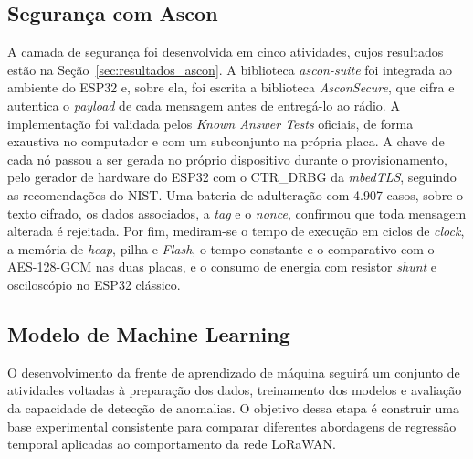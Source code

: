 

\subsection{Segurança com Ascon}
A camada de segurança foi desenvolvida em cinco atividades, cujos resultados estão na Seção~\ref{sec:resultados_ascon}. A biblioteca \textit{ascon-suite} foi integrada ao ambiente do ESP32 e, sobre ela, foi escrita a biblioteca \textit{AsconSecure}, que cifra e autentica o \textit{payload} de cada mensagem antes de entregá-lo ao rádio. A implementação foi validada pelos \textit{Known Answer Tests} oficiais, de forma exaustiva no computador e com um subconjunto na própria placa. A chave de cada nó passou a ser gerada no próprio dispositivo durante o provisionamento, pelo gerador de hardware do ESP32 com o CTR\_DRBG da \textit{mbedTLS}, seguindo as recomendações do NIST. Uma bateria de adulteração com 4.907 casos, sobre o texto cifrado, os dados associados, a \textit{tag} e o \textit{nonce}, confirmou que toda mensagem alterada é rejeitada. Por fim, mediram-se o tempo de execução em ciclos de \textit{clock}, a memória de \textit{heap}, pilha e \textit{Flash}, o tempo constante e o comparativo com o AES-128-GCM nas duas placas, e o consumo de energia com resistor \textit{shunt} e osciloscópio no ESP32 clássico.


\subsection{Modelo de Machine Learning}

O desenvolvimento da frente de aprendizado de máquina seguirá um conjunto de
atividades voltadas à preparação dos dados, treinamento dos modelos e avaliação
da capacidade de detecção de anomalias. O objetivo dessa etapa é construir uma
base experimental consistente para comparar diferentes abordagens de regressão
temporal aplicadas ao comportamento da rede LoRaWAN.

